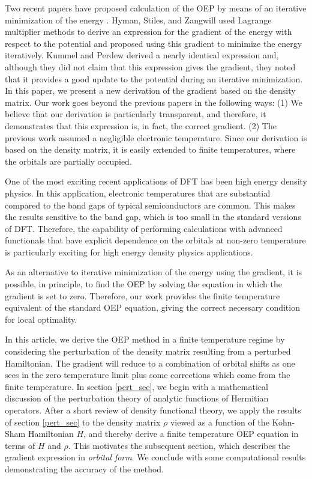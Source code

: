 \documentclass{article}
\begin{document}
Two recent papers have proposed calculation of the OEP by means of an iterative minimization
of the energy \cite{HymanStilesZangwill:00,KummelPerdew:03}.  Hyman, Stiles, and Zangwill
used Lagrange multiplier methods to derive an expression for the gradient of the energy
with respect to the potential and proposed using this gradient to minimize the
energy iteratively.  Kummel and Perdew derived a nearly identical expression and,
although they did not claim that this expression gives the gradient, they noted
that it provides a good update to the potential during an iterative minimization.
In this paper, we present a new derivation of the gradient based on the
density matrix.  Our work goes beyond the previous papers in the following ways:
(1) We believe that our derivation is particularly transparent, and therefore,
it demonstrates that this expression is, in fact, the correct gradient.
(2)  The previous work assumed a negligible electronic temperature.  Since our
derivation is based on the density matrix, it is easily extended to finite
temperatures, where the orbitals are partially occupied.

One of the most exciting recent applications of DFT has been high energy density
physics.  In this application, electronic temperatures that are substantial
compared to the band gaps of typical semiconductors are common.  This makes
the results sensitive to the band gap, which is too small in the standard
versions of DFT. Therefore, the capability of performing calculations with
advanced functionals that have explicit dependence on the orbitals at
non-zero temperature is particularly exciting for high energy density physics
applications.

As an alternative to iterative minimization of the energy using the gradient,
it is possible, in principle, to find the OEP by solving the equation in
which the gradient is set to zero.  Therefore, our work provides the finite
temperature equivalent of the standard OEP equation, giving the correct
necessary condition for local optimality.

In this article, we derive the OEP method in a finite temperature regime
by considering the perturbation of the density matrix resulting from a
perturbed Hamiltonian.
The gradient will reduce to a combination of orbital shifts as one sees
in the zero temperature limit plus some corrections which come from the
finite temperature.  In section \ref{pert_sec}, we begin with a mathematical discussion
of the perturbation theory of analytic functions of Hermitian operators.
After a short review of density functional theory, we apply the results
of section \ref{pert_sec} to the density matrix $\rho$ viewed as a function of
the Kohn-Sham Hamiltonian $H$, and thereby derive a finite temperature OEP
equation in terms of $H$ and $\rho$.   This motivates the subsequent
section, which describes the gradient expression in {\em orbital form}.
We conclude with some computational results demonstrating the accuracy
of the method.
\end{document}
